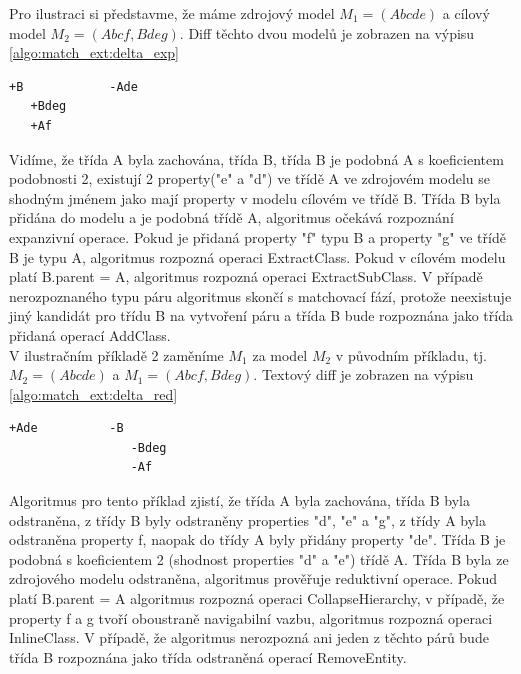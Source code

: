 \documentclass[11pt,twoside,a4paper]{book}
\begin{document}
 Pro ilustraci si představme, že máme zdrojový model $M_1 = (Abcde)$ a cílový
 model $M_2 = (Abcf, Bdeg)$. Diff těchto dvou modelů je zobrazen na výpisu
 \ref{algo:match_ext:delta_exp}

 \begin{lstlisting}[frame=single,caption=Textový diff pro
 expanzivní operaci,label=algo:match_ext:delta_exp]
   +B            -Ade
   +Bdeg          
   +Af
\end{lstlisting}
 
 Vidíme, že třída A byla zachována, třída B, třída B je podobná A s koeficientem
 podobnosti 2, existují 2 property("e" a "d") ve třídě A ve zdrojovém modelu se
 shodným jménem jako mají property v modelu cílovém ve třídě B. Třída B byla
 přidána do modelu a je podobná třídě A, algoritmus očekává rozpoznání
 expanzivní operace. Pokud je přidaná property "f" typu B a property "g" ve
 třídě B je typu A, algoritmus rozpozná operaci ExtractClass. Pokud v
 cílovém modelu platí B.parent = A, algoritmus rozpozná operaci ExtractSubClass.
 V případě nerozpoznaného typu páru algoritmus skončí s matchovací fází, protože
 neexistuje jiný kandidát pro třídu B na vytvoření páru a třída B bude
 rozpoznána jako třída přidaná operací AddClass. \\ 
 
 V ilustračním příkladě 2 zaměníme $M_1$
 za model $M_2$ v původním příkladu, tj. $M_2 = (Abcde)$ a $M_1 = (Abcf,
 Bdeg)$. Textový diff je zobrazen na výpisu \ref{algo:match_ext:delta_red}
 
  \begin{lstlisting}[frame=single,caption=Textový diff pro
 reduktivní operaci,label=algo:match_ext:delta_red]
   +Ade          -B            
                 -Bdeg          
                 -Af
\end{lstlisting}
 
 Algoritmus pro tento příklad zjistí, že třída A byla zachována, třída B byla
 odstraněna, z třídy B byly odstraněny properties "d", "e" a "g", z třídy A
 byla odstraněna property f, naopak do třídy A byly přidány property "de". Třída
 B je podobná s koeficientem 2 (shodnost properties "d" a "e") třídě A. Třída B
 byla ze zdrojového modelu odstraněna, algoritmus prověřuje reduktivní operace.
 Pokud platí B.parent = A algoritmus rozpozná operaci CollapseHierarchy, v
 případě, že property f a g tvoří oboustraně navigabilní vazbu, algoritmus
 rozpozná operaci InlineClass. V případě, že algoritmus nerozpozná ani jeden z
 těchto párů bude třída B rozpoznána jako třída odstraněná operací RemoveEntity.
 
\end{document}
